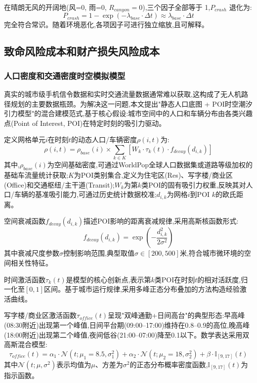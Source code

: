 在晴朗无风的开阔地(风=0, 雨=0, $R_{canyon}=0$),三个因子全部等于 1,$P_{crash}$ 退化为:
\begin{equation}
P_{crash} = 1 - \exp(-\lambda_{base} \cdot \Delta t) \approx \lambda_{base} \cdot \Delta t
\end{equation}
完全符合常识。随着环境恶化,各项因子可进行独立缩放,且可解释。


\subsection{致命风险成本和财产损失风险成本}

\subsubsection{人口密度和交通密度时空模拟模型}

真实的城市级手机信令数据和实时交通流量数据通常难以获取,这构成了无人机路径规划的主要数据瓶颈。为解决这一问题,本文提出"静态人口底图 + POI时空潮汐引力模型"的混合建模范式,基于核心假设:城市空间中的人口和车辆分布由各类兴趣点(Point of Interest, POI)在特定时刻的吸引力驱动。

定义网格单元$i$在时刻$t$的动态人口/车辆密度$\rho(i, t)$为:
\begin{equation}
\rho(i, t) = \rho_{base}(i) \times \sum_{k \in K} \left[ W_k \cdot \tau_k(t) \cdot f_{decay}(d_{i,k}) \right]
\label{eq:dynamic_density}
\end{equation}
其中,$\rho_{base}(i)$为空间基础密度,可通过WorldPop全球人口数据集或道路等级加权的基础车流量统计获取;$K$为POI类别集合,定义为住宅区(Res)、写字楼/商业区(Office)和交通枢纽/主干道(Transit);$W_k$为第$k$类POI的固有吸引力权重,反映其对人口/车辆的基准吸引能力,可通过历史统计数据校准;$d_{i,k}$为网格$i$到POI $k$的欧氏距离。

空间衰减函数$f_{decay}(d_{i,k})$描述POI影响的距离衰减规律,采用高斯核函数形式:
\begin{equation}
f_{decay}(d_{i,k}) = \exp\left(-\frac{d_{i,k}^2}{2\sigma^2}\right)
\label{eq:spatial_decay}
\end{equation}
其中衰减尺度参数$\sigma$控制影响范围,典型取值$\sigma \in [200, 500]$米,符合城市微环境的空间相关性特征。

时间激活函数$\tau_k(t)$是模型的核心创新点,表示第$k$类POI在时刻$t$的相对活跃度,归一化至$[0, 1]$区间。基于城市运行规律,采用多峰正态分布叠加的方法构造经验激活曲线。

写字楼/商业区激活函数$\tau_{office}(t)$呈现"双峰通勤+日间高台"的典型形态:早高峰(08:30附近)出现第一个峰值,日间平台期(09:00--17:00)维持在0.8--0.9的高位,晚高峰(18:00附近)出现第二个峰值,夜间低谷(21:00--07:00)降至0.1以下。数学表达采用双高斯混合模型:
\begin{equation}
\tau_{office}(t) = \alpha_1 \cdot \mathcal{N}(t; \mu_1=8.5, \sigma_1^2) + \alpha_2 \cdot \mathcal{N}(t; \mu_2=18, \sigma_2^2) + \beta \cdot \mathbb{I}_{[9,17]}(t)
\label{eq:office_activation}
\end{equation}
其中$\mathcal{N}(t; \mu, \sigma^2)$表示均值为$\mu$、方差为$\sigma^2$的正态分布概率密度函数,$\mathbb{I}_{[9,17]}(t)$为指示函数。

